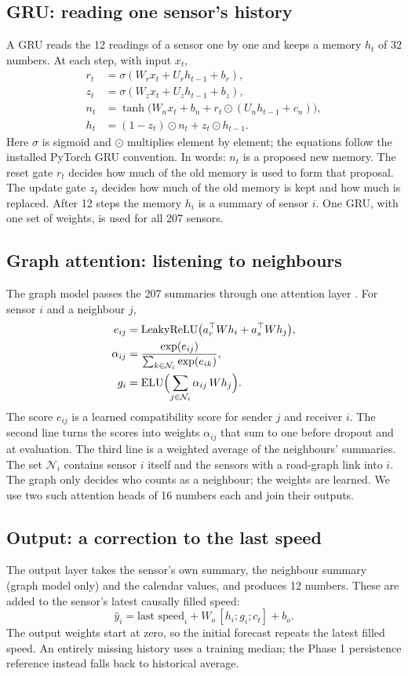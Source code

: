 \documentclass[conference]{IEEEtran}
\begin{document}
\subsection{GRU: reading one sensor's history}
A GRU reads the 12 readings of a sensor one by one and keeps a memory $h_t$ of 32 numbers. At each step, with input $x_t$,
\begin{align}
r_t&=\sigma(W_r x_t+U_r h_{t-1}+b_r),\\
z_t&=\sigma(W_z x_t+U_z h_{t-1}+b_z),\\
n_t&=\tanh\bigl(W_n x_t+b_n+r_t\odot(U_n h_{t-1}+c_n)\bigr),\\
h_t&=(1-z_t)\odot n_t+z_t\odot h_{t-1}.
\end{align}
Here $\sigma$ is sigmoid and $\odot$ multiplies element by element; the equations follow the installed PyTorch GRU convention. In words: $n_t$ is a proposed new memory. The reset gate $r_t$ decides how much of the old memory is used to form that proposal. The update gate $z_t$ decides how much of the old memory is kept and how much is replaced. After 12 steps the memory $h_i$ is a summary of sensor $i$. One GRU, with one set of weights, is used for all 207 sensors.

\subsection{Graph attention: listening to neighbours}
The graph model passes the 207 summaries through one attention layer \cite{gat}. For sensor $i$ and a neighbour $j$,
\begin{align}
e_{ij}&=\operatorname{LeakyReLU}\bigl(a_r^{\top}Wh_i+a_s^{\top}Wh_j\bigr),\\
\alpha_{ij}&=\frac{\exp(e_{ij})}{\sum_{k\in\mathcal N_i}\exp(e_{ik})},\\
g_i&=\operatorname{ELU}\Bigl(\sum_{j\in\mathcal N_i}\alpha_{ij}\,Wh_j\Bigr).
\end{align}
The score $e_{ij}$ is a learned compatibility score for sender $j$ and receiver $i$. The second line turns the scores into weights $\alpha_{ij}$ that sum to one before dropout and at evaluation. The third line is a weighted average of the neighbours' summaries. The set $\mathcal N_i$ contains sensor $i$ itself and the sensors with a road-graph link into $i$. The graph only decides who counts as a neighbour; the weights are learned. We use two such attention heads of 16 numbers each and join their outputs.

\subsection{Output: a correction to the last speed}
The output layer takes the sensor's own summary, the neighbour summary (graph model only) and the calendar values, and produces 12 numbers. These are added to the sensor's latest causally filled speed:
\begin{equation}
\hat y_{i}=\text{last speed}_i+W_o\,[h_i;g_i;c_t]+b_o .
\end{equation}
The output weights start at zero, so the initial forecast repeats the latest filled speed. An entirely missing history uses a training median; the Phase 1 persistence reference instead falls back to historical average.
\end{document}
